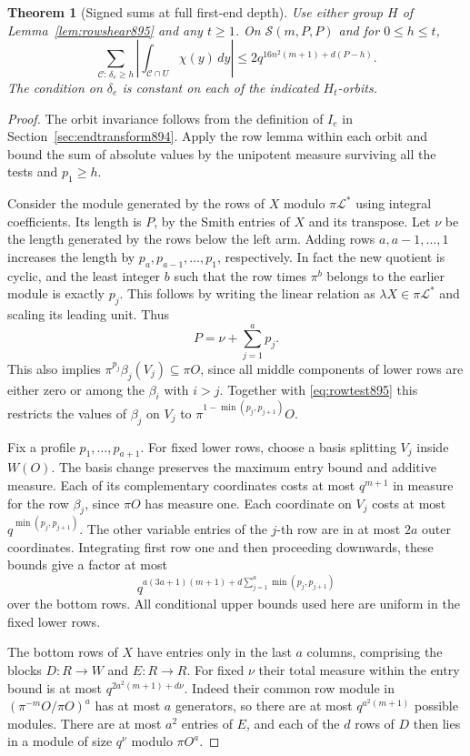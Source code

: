 \documentclass[a4paper,11pt]{article}
\newtheorem{theorem}[proposition]{Theorem}
\theoremstyle{definition}
\theoremstyle{remark}
\numberwithin{equation}{section}
\begin{document}
\begin{theorem}[Signed sums at full first-end depth]
\leavevmode\label{thm:rowdescent895}
Use either group \(H\) of Lemma~\ref{lem:rowshear895} and any
\(t\ge1\). On \(\mathcal S(m,P,P)\) and for \(0\le h\le t\),
\[
 \sum_{\mathcal C:\,\delta_e\ge h}
      \left|\int_{\mathcal C\cap U}\chi(y)\,dy\right|
             \le 2 q^{16n^2(m+1)+d(P-h)} .
\]
The condition on \(\delta_e\) is constant on each of the indicated
\(H_t\)-orbits.
\end{theorem}
\begin{proof}
The orbit invariance follows from the definition of \(I_e\) in
Section~\ref{sec:endtransform894}. Apply the row lemma within
each orbit and bound the sum of absolute values by the unipotent
measure surviving all the tests and \(p_1\ge h\).

Consider the module generated by the rows of \(X\) modulo
\(\pi\mathcal L^*\) using integral coefficients. Its length is
\(P\), by the Smith entries of \(X\) and its transpose.
Let \(\nu\) be the length generated by the rows below the left
arm. Adding rows \(a,a-1,\ldots,1\) increases the length by
\(p_a,p_{a-1},\ldots,p_1\), respectively. In fact the new
quotient is cyclic, and the least integer \(b\) such that the
row times \(\pi^b\) belongs to the earlier module is exactly
\(p_j\). This follows by writing the linear relation as
\(\lambda X\in\pi\mathcal L^*\) and scaling its leading unit.
Thus
\[
                     P=\nu+\sum_{j=1}^a p_j .
\]
This also implies
\(\pi^{p_j}\beta_j(V_j)\subseteq\pi O\), since all middle
components of lower rows are either zero or among the
\(\beta_i\) with \(i>j\). Together with \eqref{eq:rowtest895}
this restricts the values of \(\beta_j\) on \(V_j\) to
\(\pi^{1-\min(p_j,p_{j+1})}O\).

Fix a profile \(p_1,\ldots,p_{a+1}\). For fixed lower rows,
choose a basis splitting \(V_j\) inside \(W(O)\). The basis
change preserves the maximum entry bound and additive measure.
Each of its complementary coordinates costs at most \(q^{m+1}\)
in measure for the row \(\beta_j\), since \(\pi O\) has measure
one. Each coordinate on \(V_j\) costs at most
\(q^{\min(p_j,p_{j+1})}\). The other variable entries of the
\(j\)-th row are in at most \(2a\) outer coordinates. Integrating
first row one and then proceeding downwards, these bounds give
a factor at most
\[
 q^{a(3a+1)(m+1)+d\sum_{j=1}^a\min(p_j,p_{j+1})}
\]
over the bottom rows. All conditional upper bounds used here
are uniform in the fixed lower rows.

The bottom rows of \(X\) have entries only in the last \(a\)
columns, comprising the blocks \(D: R\to W\) and \(E:R\to R\).
For fixed \(\nu\) their total measure within the entry bound
is at most \(q^{2a^2(m+1)+d\nu}\). Indeed their common row
module in \((\pi^{-m}O/\pi O)^a\) has at most \(a\) generators,
so there are at most \(q^{a^2(m+1)}\) possible modules.
There are at most \(a^2\) entries of \(E\), and each of the
\(d\) rows of \(D\) then lies in a module of size \(q^\nu\)
modulo \(\pi O^a\).


\end{proof}
\end{document}
